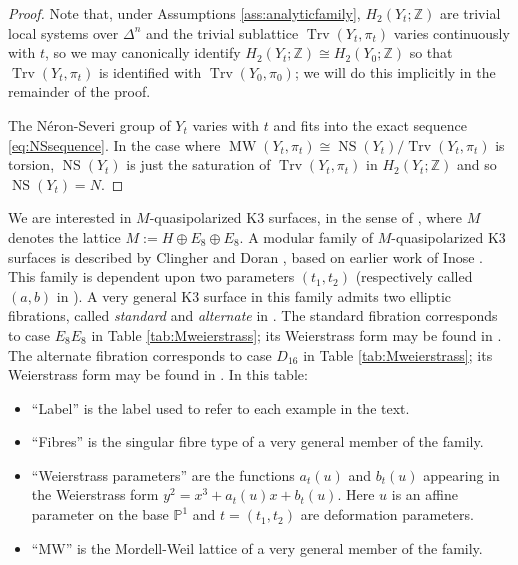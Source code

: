 \documentclass[a4paper]{amsart}
\theoremstyle{definition}
\theoremstyle{plain}
\theoremstyle{remark}
\newcommand{\bP}{\mathbb{P}}
\newcommand{\bZ}{\mathbb{Z}}
\DeclareMathOperator{\MW}{MW}
\DeclareMathOperator{\NS}{NS}
\DeclareMathOperator{\Trv}{Trv}
\numberwithin{figure}{section}
\numberwithin{table}{section}
\begin{document}
\begin{proof} Note that, under Assumptions \ref{ass:analyticfamily}, $H_2(Y_t;\bZ)$ are trivial local systems over $\Delta^n$ and the trivial sublattice $\Trv(Y_t,\pi_t)$ varies continuously with $t$, so we may canonically identify $H_2(Y_t;\bZ) \cong H_2(Y_0;\bZ)$ so that $\Trv(Y_t,\pi_t)$ is identified with $\Trv(Y_0,\pi_0)$; we will do this implicitly in the remainder of the proof.

The N\'{e}ron-Severi group of $Y_t$ varies with $t$ and fits into the exact sequence \eqref{eq:NSsequence}. In the case where $\MW({Y}_t,\pi_t) \cong  \NS(Y_t)/\Trv(Y_t,\pi_t)$ is torsion, $\NS(Y_t)$ is just the saturation of $\Trv(Y_t,\pi_t)$ in $H_2({Y}_t;\bZ)$ and so $\NS(Y_t) = {N}$.
\end{proof}

We are interested in $M$-quasipolarized K3 surfaces, in the sense of \cite[Definition 2.6]{cmk3s}, where $M$ denotes the lattice $M := H \oplus E_8 \oplus E_8$. A modular family of $M$-quasipolarized K3 surfaces is described by Clingher and Doran \cite{milpk3s}, based on earlier work of Inose \cite{desk3sni}. This family is dependent upon two parameters $(t_1,t_2)$ (respectively called $(a,b)$ in \cite{milpk3s}). A very general K3 surface in this family admits two elliptic fibrations, called \emph{standard} and \emph{alternate} in \cite{milpk3s}. The standard fibration corresponds to case $E_8E_8$ in Table \ref{tab:Mweierstrass}; its Weierstrass form may be found in \cite[Section 1]{desk3sni}. The alternate fibration corresponds to case $D_{16}$ in Table \ref{tab:Mweierstrass}; its Weierstrass form may be found in \cite[Section 4.4]{milpk3s}. In this table:
\begin{itemize}
\item ``Label'' is the label used to refer to each example in the text.
\item ``Fibres'' is the singular fibre type of a very general member of the family.
\item ``Weierstrass parameters'' are the functions $a_t(u)$ and $b_t(u)$ appearing in the Weierstrass form $y^2 = x^3 + a_t(u)x + b_t(u)$. Here $u$ is an affine parameter on the base $\bP^1$ and $t = (t_1,t_2)$ are deformation parameters.
\item ``MW'' is the Mordell-Weil lattice of a very general member of the family.
\end{itemize}
\end{document}
